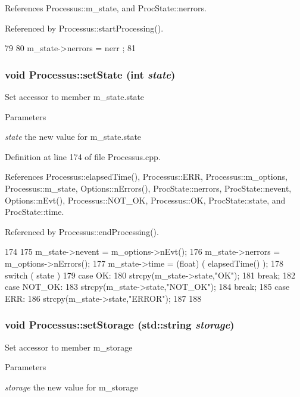 References Processus::m\_\-state, and ProcState::nerrors.

Referenced by Processus::startProcessing().


\begin{DoxyCode}
79                                              {
80   m_state->nerrors = nerr ;
81 }
\end{DoxyCode}
\hypertarget{classProcessus_ad38cde0f1bcefa00b068e7947b8af927}{
\subsubsection[{setState}]{\setlength{\rightskip}{0pt plus 5cm}void Processus::setState (int {\em state})}}
\label{classProcessus_ad38cde0f1bcefa00b068e7947b8af927}
Set accessor to member m\_\-state.state 
\begin{DoxyParams}{Parameters}
\item[{\em state}]the new value for m\_\-state.state \end{DoxyParams}


Definition at line 174 of file Processus.cpp.

References Processus::elapsedTime(), Processus::ERR, Processus::m\_\-options, Processus::m\_\-state, Options::nErrors(), ProcState::nerrors, ProcState::nevent, Options::nEvt(), Processus::NOT\_\-OK, Processus::OK, ProcState::state, and ProcState::time.

Referenced by Processus::endProcessing().


\begin{DoxyCode}
174                                      {
175   m_state->nevent  = m_options->nEvt();
176   m_state->nerrors = m_options->nErrors();
177   m_state->time    = (float) ( elapsedTime() );
178   switch ( state ){
179   case OK:
180     strcpy(m_state->state,"OK");
181     break;
182   case NOT_OK:
183     strcpy(m_state->state,"NOT_OK");
184     break;
185   case ERR:
186     strcpy(m_state->state,"ERROR");
187   }
188 }
\end{DoxyCode}
\hypertarget{classProcessus_ad57a29b33f9021eda9f6929136f1784f}{
\subsubsection[{setStorage}]{\setlength{\rightskip}{0pt plus 5cm}void Processus::setStorage (std::string {\em storage})}}
\label{classProcessus_ad57a29b33f9021eda9f6929136f1784f}
Set accessor to member m\_\-storage 
\begin{DoxyParams}{Parameters}
\item[{\em storage}]the new value for m\_\-storage \end{DoxyParams}


